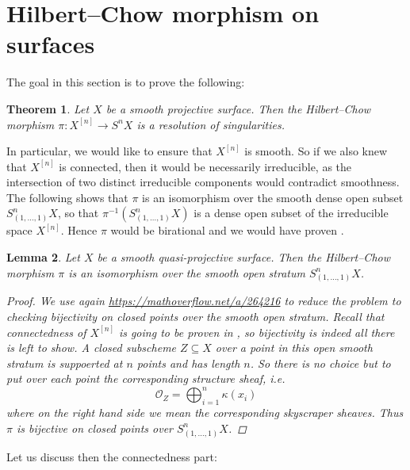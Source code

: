 \documentclass[12pt,a4paper]{amsart}
\theoremstyle{plain}
\newtheorem{thm}{Theorem}[section]
\newtheorem{lm}[thm]{Lemma}
\theoremstyle{definition}
\theoremstyle{remark}
\begin{document}
\section{Hilbert--Chow morphism on surfaces}

The goal in this section is to prove the following:

\begin{thm}\label{thm:resolution}
  Let $X$ be a smooth projective surface.
  Then the Hilbert--Chow morphism $\pi \colon X^{[n]} \to S^{n}X$ is a resolution of singularities.
\end{thm}

In particular, we would like to ensure that $X^{[n]}$ is smooth.
So if we also knew that $X^{[n]}$ is connected, then it would be necessarily irreducible, as the intersection of two distinct irreducible components would contradict smoothness.
The following  shows that $\pi$ is an isomorphism over the smooth dense open subset $S^{n}_{(1,\ldots,1)}X$, so that $\pi^{-1}(S^{n}_{(1, \ldots, 1)}X)$ is a dense open subset of the irreducible space $X^{[n]}$.
Hence $\pi$ would be birational and we would have proven .

\begin{lm}\label{lm:overstratum}
  Let $X$ be a smooth quasi-projective surface.
  Then the Hilbert--Chow morphism $\pi$ is an isomorphism over the smooth open stratum $S^{n}_{(1,\ldots,1)}X$.
  \begin{proof}
    We use again \url{https://mathoverflow.net/a/264216} to reduce the problem to checking bijectivity on closed points over the smooth open stratum.
    Recall that connectedness of $X^{[n]}$ is going to be proven in , so bijectivity is indeed all there is left to show.
    A closed subscheme $Z \subseteq X$ over a point in this open smooth stratum is suppoerted at $n$ points and has length $n$.
    So there is no choice but to put over each point the corresponding structure sheaf, i.e.
    \[ \mathscr{O}_{Z} = \bigoplus_{i = 1}^{n} \kappa(x_{i}) \]
    where on the right hand side we mean the corresponding skyscraper sheaves.
    Thus $\pi$ is bijective on closed points over $S^{n}_{(1, \ldots, 1)}X$.
  \end{proof}
\end{lm}

Let us discuss then the connectedness part:
\end{document}
